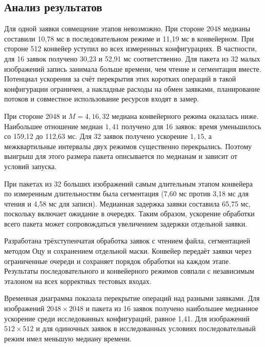 \clearpage\subsection{Анализ результатов}
Для одной заявки совмещение этапов невозможно. При стороне 2048 медианы составили 10,78 мс в последовательном режиме и 11,19 мс в конвейерном. При стороне 512 конвейер уступил во всех измеренных конфигурациях. В частности, для 16 заявок получено 30,23 и 52,91 мс соответственно. Для пакета из 32 малых изображений запись занимала больше времени, чем чтение и сегментация вместе. Потенциал ускорения за счёт перекрытия этих коротких операций в такой конфигурации ограничен, а накладные расходы на обмен заявками, планирование потоков и совместное использование ресурсов входят в замер.

При стороне 2048 и \(M=4,16,32\) медиана конвейерного режима оказалась ниже. Наибольшее отношение медиан \(1{,}41\) получено для 16 заявок: время уменьшилось со 159,12 до 112,63 мс. Для 32 заявок получено ускорение \(1{,}15\), а межквартильные интервалы двух режимов существенно перекрылись. Поэтому выигрыш для этого размера пакета описывается по медианам и зависит от условий запуска.

При пакетах из 32 больших изображений самым длительным этапом конвейера по измеренным длительностям была сегментация (7,60 мс против 3,18 мс для чтения и 4,58 мс для записи). Медианная задержка заявки составила 65,75 мс, поскольку включает ожидание в очередях. Таким образом, ускорение обработки всего пакета может сопровождаться увеличением задержки отдельной заявки.

Разработана трёхступенчатая обработка заявок с чтением файла, сегментацией методом Оцу и сохранением отдельной маски. Конвейер передаёт заявки через ограниченные очереди и сохраняет порядок обработки на каждом этапе. Результаты последовательного и конвейерного режимов совпали с независимым эталоном на всех корректных тестовых входах.

Временная диаграмма показала перекрытие операций над разными заявками. Для изображений \(2048\times2048\) и пакета из 16 заявок получено наибольшее медианное ускорение среди исследованных конфигураций, равное 1,41. Для изображений \(512\times512\) и для одиночных заявок в исследованных условиях последовательный режим имел меньшую медиану времени.
